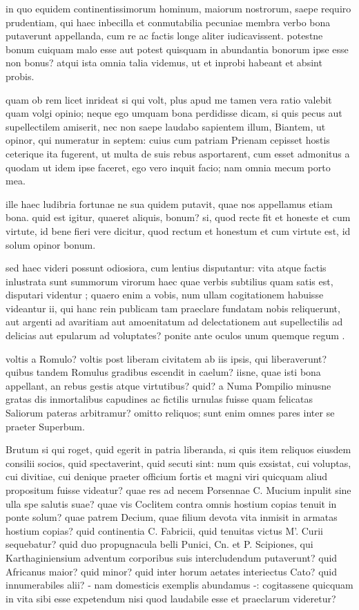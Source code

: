  in quo equidem continentissimorum hominum, maiorum nostrorum, saepe requiro prudentiam, qui haec inbecilla et conmutabilia pecuniae membra verbo bona putaverunt appellanda, cum re ac factis longe aliter iudicavissent. potestne bonum cuiquam malo esse aut potest quisquam in abundantia bonorum ipse esse non bonus? atqui ista omnia talia videmus, ut et inprobi habeant et absint probis.

 quam ob rem licet inrideat si qui volt, plus apud me tamen vera ratio valebit quam volgi opinio; neque ego umquam bona perdidisse dicam, si quis pecus aut supellectilem amiserit, nec non saepe laudabo sapientem illum, Biantem, ut opinor, qui numeratur in septem: cuius cum patriam Prienam cepisset hostis ceterique ita fugerent, ut multa de suis rebus asportarent, cum esset admonitus a quodam ut idem ipse faceret, ego vero inquit facio; nam omnia mecum porto mea.

 ille haec ludibria fortunae ne sua quidem putavit, quae nos appellamus etiam bona. quid est igitur, quaeret aliquis, bonum? si, quod recte fit et honeste et cum virtute, id bene fieri vere dicitur, quod rectum et honestum et cum virtute est, id solum opinor bonum.

 sed haec videri possunt odiosiora, cum lentius disputantur: vita atque factis inlustrata sunt summorum virorum haec quae verbis subtilius quam satis est, disputari videntur ; quaero enim a vobis, num ullam cogitationem habuisse videantur ii, qui hanc rein publicam tam praeclare fundatam nobis reliquerunt, aut argenti ad avaritiam aut amoenitatum ad delectationem aut supellectilis ad delicias aut epularum ad voluptates? ponite ante oculos unum quemque regum .

 voltis a Romulo? voltis post liberam civitatem ab iis ipsis, qui liberaverunt? quibus tandem Romulus gradibus escendit in caelum? iisne, quae isti bona appellant, an rebus gestis atque virtutibus? quid? a Numa Pompilio minusne gratas dis inmortalibus capudines ac fictilis urnulas fuisse quam felicatas Saliorum pateras arbitramur? omitto reliquos; sunt enim omnes pares inter se praeter Superbum.

 Brutum si qui roget, quid egerit in patria liberanda, si quis item reliquos eiusdem consilii socios, quid spectaverint, quid secuti sint: num quis exsistat, cui voluptas, cui divitiae, cui denique praeter officium fortis et magni viri quicquam aliud propositum fuisse videatur? quae res ad necem Porsennae C. Mucium inpulit sine ulla spe salutis suae? quae vis Coclitem contra omnis hostium copias tenuit in ponte solum? quae patrem Decium, quae filium devota vita inmisit in armatas hostium copias? quid continentia C. Fabricii, quid tenuitas victus M'. Curii sequebatur? quid duo propugnacula belli Punici, Cn. et P. Scipiones, qui Karthaginiensium adventum corporibus suis intercludendum putaverunt? quid Africanus maior? quid minor? quid inter horum aetates interiectus Cato? quid innumerabiles alii? - nam domesticis exemplis abundamus -: cogitassene quicquam in vita sibi esse expetendum nisi quod laudabile esse et praeclarum videretur?

